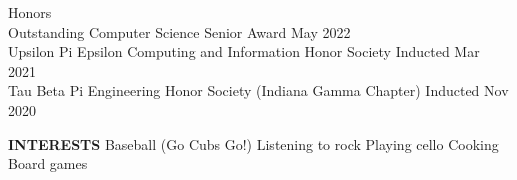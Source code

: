 \documentclass{resume} %
\begin{document}
\begin{rSection}{Honors}
\\ { Outstanding Computer Science Senior Award } \hfill { May 2022 }
\vspace{0.1em}
\\ { Upsilon Pi Epsilon Computing and Information Honor Society } \hfill { Inducted Mar 2021 $\,\!\!$}
\vspace{0.1em}
\\ { Tau Beta Pi Engineering Honor Society (Indiana Gamma Chapter) } \hfill { Inducted Nov 2020 $\,$}
\end{rSection}

{\bf INTERESTS} \hspace{1em} Baseball (Go Cubs Go!) \hspace{1em} Listening to rock \hspace{1em} Playing cello \hspace{1em} Cooking \hspace{1em} Board games 

\end{document}
